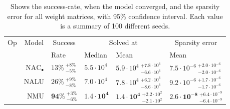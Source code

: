 \begin{table}[!h]

\caption{\label{tab:very-simple-function-results}Shows the success-rate, when the model converged, and the sparsity error for all weight matrices, with 95\% confidence interval. Each value is a summary of 100 different seeds.}
\centering
\begin{tabular}{crllll}
\toprule
\multicolumn{1}{c}{Op} & \multicolumn{1}{c}{Model} & \multicolumn{1}{c}{Success} & \multicolumn{2}{c}{Solved at} & \multicolumn{1}{c}{Sparsity error} \\
\cmidrule(l{3pt}r{3pt}){1-1} \cmidrule(l{3pt}r{3pt}){2-2} \cmidrule(l{3pt}r{3pt}){3-3} \cmidrule(l{3pt}r{3pt}){4-5} \cmidrule(l{3pt}r{3pt}){6-6}
 &  & Rate & Median & Mean & Mean\\
\midrule
 & $\mathrm{NAC}_{\bullet}$ & $13\% {~}^{+8\%}_{-5\%}$ & $5.5 \cdot 10^{4}$ & $5.9 \cdot 10^{4} {~}^{+7.8 \cdot 10^{3}}_{-6.6 \cdot 10^{3}}$ & $7.5 \cdot 10^{-6} {~}^{+2.0 \cdot 10^{-6}}_{-2.0 \cdot 10^{-6}}$\\

\nopagebreak
 & NALU & $26\% {~}^{+9\%}_{-8\%}$ & $7.0 \cdot 10^{4}$ & $7.8 \cdot 10^{4} {~}^{+6.2 \cdot 10^{3}}_{-8.6 \cdot 10^{3}}$ & $9.2 \cdot 10^{-6} {~}^{+1.7 \cdot 10^{-6}}_{-1.7 \cdot 10^{-6}}$\\

\nopagebreak
\multirow{-3}{*}{\centering\arraybackslash $\bm{\times}$} & NMU & $\mathbf{94\%} {~}^{+3\%}_{-6\%}$ & $\mathbf{1.4 \cdot 10^{4}}$ & $\mathbf{1.4 \cdot 10^{4}} {~}^{+2.2 \cdot 10^{2}}_{-2.1 \cdot 10^{2}}$ & $\mathbf{2.6 \cdot 10^{-8}} {~}^{+6.4 \cdot 10^{-9}}_{-6.4 \cdot 10^{-9}}$\\
\bottomrule
\end{tabular}
\end{table}
